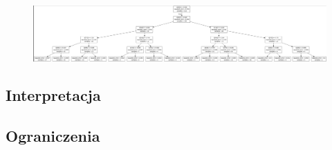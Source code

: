 \begin{figure}[H]
    \centering
    \includegraphics[width=\textwidth]{images/tree.png}
    \caption{}
    \label{tree-graph}
\end{figure}

\subsection{Interpretacja}

\subsection{Ograniczenia}